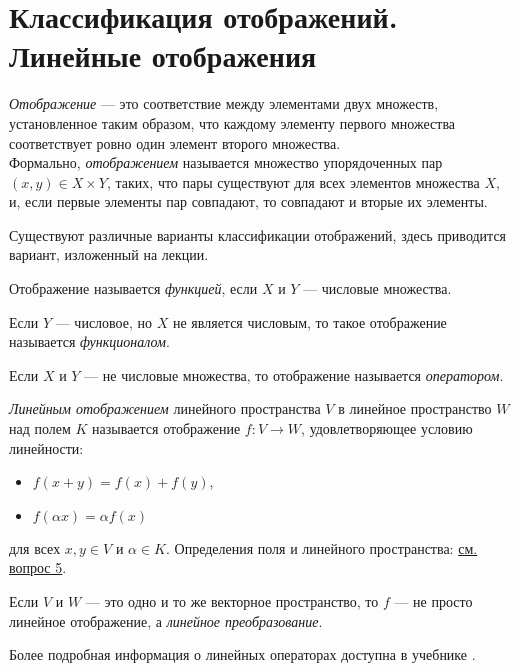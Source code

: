 \section{Классификация отображений. Линейные отображения}
\label{sec:q-8}
\textit{Отображение} --- это соответствие между элементами двух множеств, установленное таким образом, что каждому элементу первого множества соответствует ровно один элемент второго множества.\\
Формально, \textit{отображением} называется множество упорядоченных пар $(x,y)\in X\times Y$, таких, что пары существуют для всех элементов множества $X$, и, если первые элементы пар совпадают, то совпадают и вторые их элементы.

Существуют различные варианты классификации отображений, здесь приводится вариант, изложенный на лекции.

Отображение называется \textit{функцией}, если $X$ и $Y$ --- числовые множества.

Если $Y$ ---  числовое, но $X$ не является числовым, то такое отображение называется \textit{функционалом}.

Если $X$ и $Y$ --- не числовые множества, то отображение называется \textit{оператором}.

\textit{Линейным отображением} линейного пространства $V$ в линейное пространство $W$ над полем $K$ называется отображение $f\colon V\rightarrow W$, удовлетворяющее условию линейности:
\begin{itemize}
	\itemsep0em
	\item $f(x+y)=f(x)+f(y)$,
	\item $f(\alpha x)=\alpha f(x)$
\end{itemize}
для всех ${\displaystyle x,y\in V}$ и $\alpha \in K$. Определения поля и линейного пространства: \hyperref[sec:q-5]{см. вопрос 5}.

Если $V$ и $W$ --- это одно и то же векторное пространство, то $f$ --- не просто линейное отображение, а \textit{линейное преобразование}.

Более подробная информация о линейных операторах доступна в учебнике \cite[с.~109]{trenogin}.